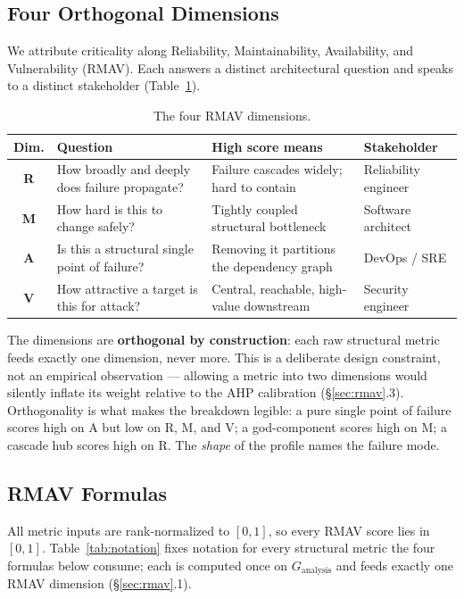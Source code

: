 \documentclass[review]{elsarticle}
\begin{document}
\subsection{Four Orthogonal Dimensions}

We attribute criticality along Reliability, Maintainability, Availability, and Vulnerability (RMAV).
Each answers a distinct architectural question and speaks to a distinct stakeholder
(Table~\ref{tab:rmavdims}).

\begin{table}[h]
\centering
\caption{The four RMAV dimensions.}
\label{tab:rmavdims}
\begin{tabular}{@{}cp{3.4cm}p{3.6cm}p{2.6cm}@{}}
\toprule
Dim. & Question & High score means & Stakeholder \\
\midrule
\textbf{R} & How broadly and deeply does failure propagate? & Failure cascades widely; hard to contain & Reliability engineer \\
\textbf{M} & How hard is this to change safely? & Tightly coupled structural bottleneck & Software architect \\
\textbf{A} & Is this a structural single point of failure? & Removing it partitions the dependency graph & DevOps / SRE \\
\textbf{V} & How attractive a target is this for attack? & Central, reachable, high-value downstream & Security engineer \\
\bottomrule
\end{tabular}
\end{table}

The dimensions are \textbf{orthogonal by construction}: each raw structural metric feeds exactly one
dimension, never more. This is a deliberate design constraint, not an empirical observation ---
allowing a metric into two dimensions would silently inflate its weight relative to the AHP
calibration (\S\ref{sec:rmav}.3). Orthogonality is what makes the breakdown legible: a pure single
point of failure scores high on A but low on R, M, and V; a god-component scores high on M; a
cascade hub scores high on R. The \emph{shape} of the profile names the failure mode.

\subsection{RMAV Formulas}

All metric inputs are rank-normalized to $[0,1]$, so every RMAV score lies in $[0,1]$.
Table~\ref{tab:notation} fixes notation for every structural metric the four formulas below
consume; each is computed once on $G_{\text{analysis}}$ and feeds exactly one RMAV dimension
(\S\ref{sec:rmav}.1).
\end{document}
